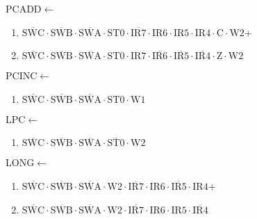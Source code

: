 \documentclass[UTF8]{ctexart}
\begin{document}
PCADD$\leftarrow$
\begin{enumerate}[\indent\indent]
	\item$\overline{\text{SWC}}\cdot\overline{\text{SWB}}\cdot\overline{\text{SWA}}\cdot\text{ST0}\cdot\overline{\text{IR7}}\cdot{\text{IR6}}\cdot{\text{IR5}}\cdot{\text{IR4}}\cdot\text{C}\cdot\text{W2}$+
	\item$\overline{\text{SWC}}\cdot\overline{\text{SWB}}\cdot\overline{\text{SWA}}\cdot\text{ST0}\cdot{\text{IR7}}\cdot\overline{\text{IR6}}\cdot\overline{\text{IR5}}\cdot\overline{\text{IR4}}\cdot\text{Z}\cdot\text{W2}$
\end{enumerate}
PCINC$\leftarrow$
\begin{enumerate}[\indent\indent]
	\item$\overline{\text{SWC}}\cdot\overline{\text{SWB}}\cdot\overline{\text{SWA}}\cdot\text{ST0}\cdot\text{W1}$
\end{enumerate}
LPC$\leftarrow$
\begin{enumerate}[\indent\indent]
	\item$\overline{\text{SWC}}\cdot\overline{\text{SWB}}\cdot\overline{\text{SWA}}\cdot\overline{\text{ST0}}\cdot\text{W2}$
\end{enumerate}
LONG$\leftarrow$
\begin{enumerate}[\indent\indent]
	\item$\overline{\text{SWC}}\cdot\overline{\text{SWB}}\cdot\overline{\text{SWA}}\cdot\text{W2}\cdot\overline{\text{IR7}}\cdot{\text{IR6}}\cdot\overline{\text{IR5}}\cdot{\text{IR4}}$+
	\item$\overline{\text{SWC}}\cdot\overline{\text{SWB}}\cdot\overline{\text{SWA}}\cdot\text{W2}\cdot\overline{\text{IR7}}\cdot{\text{IR6}}\cdot{\text{IR5}}\cdot\overline{\text{IR4}}$
\end{enumerate}
\end{document}
